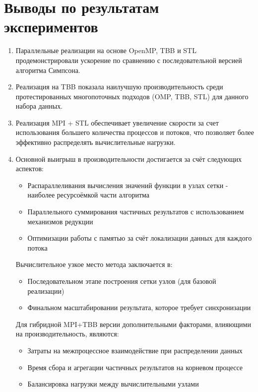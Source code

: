\documentclass[12pt]{article}
\begin{document}
\newpage
\section{Выводы по результатам экспериментов}
\begin{enumerate}
    \item Параллельные реализации на основе OpenMP, TBB и STL продемонстрировали ускорение по сравнению с последовательной версией алгоритма Симпсона.
    \item Реализация на TBB показала наилучшую производительность среди протестированных многопоточных подходов (OMP, TBB, STL) для данного набора данных.
    \item  Реализация MPI + STL обеспечивает увеличение скорости за счет использования большего количества процессов и потоков, что позволяет более эффективно распределять вычислительные нагрузки.
     \item Основной выигрыш в производительности достигается за счёт следующих аспектов:
    \begin{itemize}
        \item Распараллеливания вычисления значений функции в узлах сетки - наиболее ресурсоёмкой части алгоритма
        \item Параллельного суммирования частичных результатов с использованием механизмов редукции
        \item Оптимизации работы с памятью за счёт локализации данных для каждого потока
    \end{itemize}
    
    Вычислительное узкое место метода заключается в:
    \begin{itemize}
        \item Последовательном этапе построения сетки узлов (для базовой реализации)
        \item Финальном масштабировании результата, которое требует синхронизации
    \end{itemize}
    
    Для гибридной MPI+TBB версии дополнительными факторами, влияющими на производительность, являются:
    \begin{itemize}
        \item Затраты на межпроцессное взаимодействие при распределении данных
        \item Время сбора и агрегации частичных результатов на корневом процессе
        \item Балансировка нагрузки между вычислительными узлами
    \end{itemize}
\end{enumerate}
\end{document}

